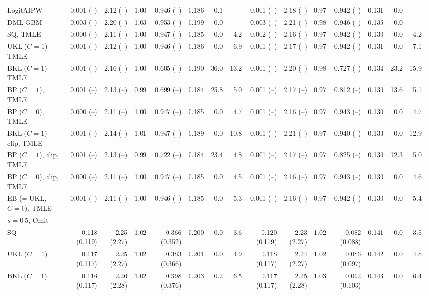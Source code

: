 \begin{tabular}{lrrrrrrrrrrrrrr}
LogitAIPW & 0.001 (--) & 2.12 (--) & 1.00 & 0.946 (--) & 0.186 & 0.1 & -- & 0.001 (--) & 2.18 (--) & 0.97 & 0.942 (--) & 0.131 & 0.0 & -- \\
DML-GBM & 0.003 (--) & 2.20 (--) & 1.03 & 0.953 (--) & 0.199 & 0.0 & -- & 0.003 (--) & 2.21 (--) & 0.98 & 0.946 (--) & 0.135 & 0.0 & -- \\
SQ, TMLE & 0.000 (--) & 2.11 (--) & 1.00 & 0.947 (--) & 0.185 & 0.0 & 4.2 & 0.002 (--) & 2.16 (--) & 0.97 & 0.942 (--) & 0.130 & 0.0 & 4.2 \\
UKL ($C=1$), TMLE & 0.001 (--) & 2.12 (--) & 1.00 & 0.946 (--) & 0.186 & 0.0 & 6.9 & 0.001 (--) & 2.17 (--) & 0.97 & 0.942 (--) & 0.131 & 0.0 & 7.1 \\
BKL ($C=1$), TMLE & 0.001 (--) & 2.16 (--) & 1.00 & 0.605 (--) & 0.190 & 36.0 & 13.2 & 0.001 (--) & 2.20 (--) & 0.98 & 0.727 (--) & 0.134 & 23.2 & 15.9 \\
BP ($C=1$), TMLE & 0.001 (--) & 2.13 (--) & 0.99 & 0.699 (--) & 0.184 & 25.8 & 5.0 & 0.001 (--) & 2.17 (--) & 0.97 & 0.812 (--) & 0.130 & 13.6 & 5.1 \\
BP ($C=0$), TMLE & 0.000 (--) & 2.11 (--) & 1.00 & 0.947 (--) & 0.185 & 0.0 & 4.7 & 0.001 (--) & 2.16 (--) & 0.97 & 0.943 (--) & 0.130 & 0.0 & 4.7 \\
BKL ($C=1$), clip, TMLE & 0.001 (--) & 2.14 (--) & 1.01 & 0.947 (--) & 0.189 & 0.0 & 10.8 & 0.001 (--) & 2.21 (--) & 0.97 & 0.940 (--) & 0.133 & 0.0 & 12.9 \\
BP ($C=1$), clip, TMLE & 0.001 (--) & 2.13 (--) & 0.99 & 0.722 (--) & 0.184 & 23.4 & 4.8 & 0.001 (--) & 2.17 (--) & 0.97 & 0.825 (--) & 0.130 & 12.3 & 5.0 \\
BP ($C=0$), clip, TMLE & 0.000 (--) & 2.11 (--) & 1.00 & 0.947 (--) & 0.185 & 0.0 & 4.5 & 0.001 (--) & 2.16 (--) & 0.97 & 0.943 (--) & 0.130 & 0.0 & 4.6 \\
EB (= UKL, $C=0$), TMLE & 0.001 (--) & 2.11 (--) & 1.00 & 0.946 (--) & 0.185 & 0.0 & 5.3 & 0.001 (--) & 2.16 (--) & 0.97 & 0.942 (--) & 0.130 & 0.0 & 5.4 \\
\multicolumn{15}{l}{$s=0.5$, Omit} \\
SQ & 0.118 (0.119) & 2.25 (2.27) & 1.02 & 0.366 (0.352) & 0.200 & 0.0 & 3.6 & 0.120 (0.119) & 2.23 (2.27) & 1.02 & 0.082 (0.088) & 0.141 & 0.0 & 3.5 \\
UKL ($C=1$) & 0.117 (0.117) & 2.25 (2.27) & 1.02 & 0.383 (0.366) & 0.201 & 0.0 & 4.9 & 0.118 (0.117) & 2.24 (2.27) & 1.02 & 0.086 (0.097) & 0.142 & 0.0 & 4.8 \\
BKL ($C=1$) & 0.116 (0.117) & 2.26 (2.28) & 1.02 & 0.398 (0.376) & 0.203 & 0.2 & 6.5 & 0.117 (0.117) & 2.25 (2.28) & 1.03 & 0.092 (0.103) & 0.143 & 0.0 & 6.4 \\

\end{tabular}
